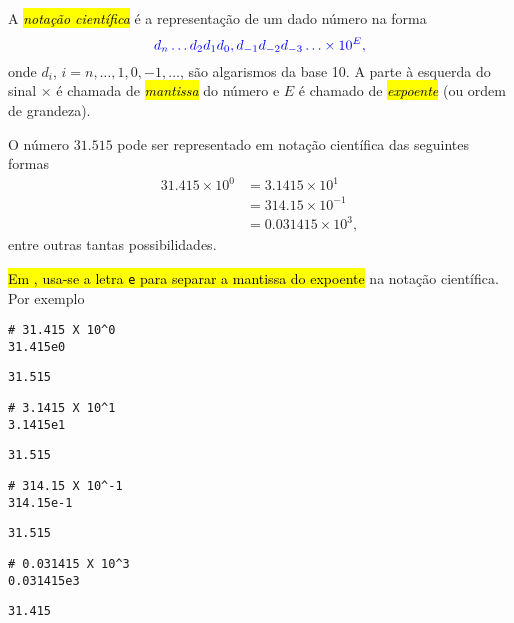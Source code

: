 A \hl{\emph{notação científica}} é a representação de um dado número na forma
\begin{equation}
  \color{blue}d_{n}\ldots d_2d_1d_0,d_{-1}d_{-2}d_{-3}\ldots \times 10^{E},
\end{equation}
onde $d_i$, $i=n, \ldots, 1, 0, -1, \ldots$, são algarismos da base 10. A parte à esquerda do sinal $\times$ é chamada de \hl{\emph{mantissa}} do número e $E$ é chamado de \hl{\emph{expoente}} (ou ordem de grandeza).

\begin{ex}\label{ex:notacao_cientifica}
  O número $31.515$ pode ser representado em notação científica das seguintes formas
  \begin{align}
    31.415\times 10^0 &= 3.1415\times 10^{1} \\
                      &= 314.15\times 10^{-1} \\
                      &= 0.031415\times 10^{3},
  \end{align}
  entre outras tantas possibilidades.

  \hl{Em {\python}, usa-se a letra \texttt{e} para separar a mantissa do expoente} na notação científica. Por exemplo

\begin{lstlisting}
# 31.415 X 10^0
31.415e0
\end{lstlisting}

\begin{verbatim}
31.515
\end{verbatim}

\begin{lstlisting}
# 3.1415 X 10^1
3.1415e1
\end{lstlisting}

\begin{verbatim}
31.515
\end{verbatim}

\begin{lstlisting}
# 314.15 X 10^-1
314.15e-1
\end{lstlisting}

\begin{verbatim}
31.515
\end{verbatim}

\begin{lstlisting}
# 0.031415 X 10^3
0.031415e3
\end{lstlisting}

\begin{verbatim}
31.415
\end{verbatim}

\end{ex}


